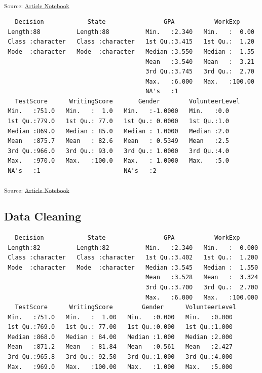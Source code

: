 \documentclass[
  letterpaper,
  DIV=11,
  numbers=noendperiod]{scrartcl}
\begin{document}
\textsubscript{Source:
\href{https://verkyyi.github.io/5900-hw1/index.qmd.html}{Article
Notebook}}

\begin{verbatim}
   Decision            State                GPA           WorkExp      
 Length:88          Length:88          Min.   :2.340   Min.   :  0.00  
 Class :character   Class :character   1st Qu.:3.415   1st Qu.:  1.20  
 Mode  :character   Mode  :character   Median :3.550   Median :  1.55  
                                       Mean   :3.540   Mean   :  3.21  
                                       3rd Qu.:3.745   3rd Qu.:  2.70  
                                       Max.   :6.000   Max.   :100.00  
                                       NA's   :1                       
   TestScore      WritingScore       Gender        VolunteerLevel
 Min.   :751.0   Min.   :  1.0   Min.   :-1.0000   Min.   :0.0   
 1st Qu.:779.0   1st Qu.: 77.0   1st Qu.: 0.0000   1st Qu.:1.0   
 Median :869.0   Median : 85.0   Median : 1.0000   Median :2.0   
 Mean   :875.7   Mean   : 82.6   Mean   : 0.5349   Mean   :2.5   
 3rd Qu.:966.0   3rd Qu.: 93.0   3rd Qu.: 1.0000   3rd Qu.:4.0   
 Max.   :970.0   Max.   :100.0   Max.   : 1.0000   Max.   :5.0   
 NA's   :1                       NA's   :2                       
\end{verbatim}

\textsubscript{Source:
\href{https://verkyyi.github.io/5900-hw1/index.qmd.html}{Article
Notebook}}

\subsection{Data Cleaning}\label{data-cleaning}

\begin{verbatim}
   Decision            State                GPA           WorkExp       
 Length:82          Length:82          Min.   :2.340   Min.   :  0.000  
 Class :character   Class :character   1st Qu.:3.402   1st Qu.:  1.200  
 Mode  :character   Mode  :character   Median :3.545   Median :  1.550  
                                       Mean   :3.528   Mean   :  3.324  
                                       3rd Qu.:3.700   3rd Qu.:  2.700  
                                       Max.   :6.000   Max.   :100.000  
   TestScore      WritingScore        Gender      VolunteerLevel 
 Min.   :751.0   Min.   :  1.00   Min.   :0.000   Min.   :0.000  
 1st Qu.:769.0   1st Qu.: 77.00   1st Qu.:0.000   1st Qu.:1.000  
 Median :868.0   Median : 84.00   Median :1.000   Median :2.000  
 Mean   :871.2   Mean   : 81.84   Mean   :0.561   Mean   :2.427  
 3rd Qu.:965.8   3rd Qu.: 92.50   3rd Qu.:1.000   3rd Qu.:4.000  
 Max.   :969.0   Max.   :100.00   Max.   :1.000   Max.   :5.000  
\end{verbatim}
\end{document}

